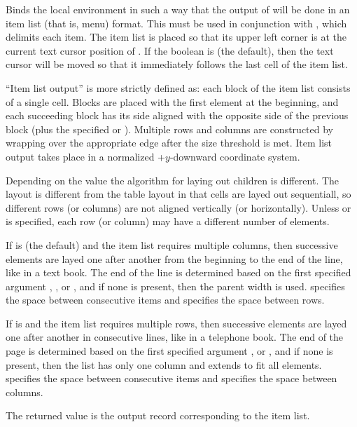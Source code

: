 Binds the local environment in such a way that the output of  will be
done in an item list (that is, menu) format.  This must be used in conjunction
with , which delimits each item.  The item list is placed so
that its upper left corner is at the current text cursor position of
.  If the boolean  is  (the default),
then the text cursor will be moved so that it immediately follows the last cell
of the item list.

``Item list output'' is more strictly defined as: each block of the item list
consists of a single cell.  Blocks are placed with the first element at the
beginning, and each succeeding block has its side aligned with the opposite side
of the previous block (plus the specified  or ).
Multiple rows and columns are constructed by wrapping over the appropriate edge
after the size threshold is met. Item list output takes place in a normalized
+$y$-downward coordinate system.

Depending on the value  the algorithm for laying out children is
different. The layout is different from the table layout in that cells are layed
out sequentiall, so different rows (or columns) are not aligned vertically (or
horizontally). Unless  or  is specified, each row
(or column) may have a different number of elements.

If  is  (the default) and the item list requires
multiple columns, then successive elements are layed one after another from
the beginning to the end of the line, like in a text book. The end of the line
is determined based on the first specified argument ,
, or , and if none is present, then the parent
width is used.  specifies the space between consecutive items
and  specifies the space between rows.

If  is  and the item list requires multiple rows,
then successive elements are layed one after another in consecutive lines,
like in a telephone book. The end of the page is determined based on the first
specified argument ,  or , and if
none is present, then the list has only one column and extends to fit all
elements.   specifies the space between consecutive items and
 specifies the space between columns.

The returned value is the output record corresponding to the item list.

